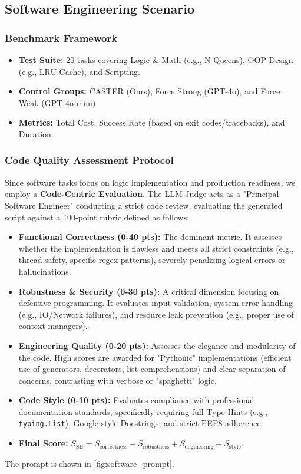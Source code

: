 \documentclass{article}
\theoremstyle{plain}
\theoremstyle{definition}
\theoremstyle{remark}
\begin{document}
\subsection{Software Engineering Scenario}

\subsubsection{Benchmark Framework}
\begin{itemize}
    \item \textbf{Test Suite:} 20 tasks covering Logic \& Math (e.g., N-Queens), OOP Design (e.g., LRU Cache), and Scripting.
    \item \textbf{Control Groups:} CASTER (Ours), Force Strong (GPT-4o), and Force Weak (GPT-4o-mini).
    \item \textbf{Metrics:} Total Cost, Success Rate (based on exit codes/tracebacks), and Duration.
\end{itemize}

\subsubsection{Code Quality Assessment Protocol}
Since software tasks focus on logic implementation and production readiness, we employ a \textbf{Code-Centric Evaluation}. The LLM Judge acts as a "Principal Software Engineer" conducting a strict code review, evaluating the generated script against a 100-point rubric defined as follows:
\begin{itemize}
    \item \textbf{Functional Correctness (0-40 pts):} The dominant metric. It assesses whether the implementation is flawless and meets all strict constraints (e.g., thread safety, specific regex patterns), severely penalizing logical errors or hallucinations.
    \item \textbf{Robustness \& Security (0-30 pts):} A critical dimension focusing on defensive programming. It evaluates input validation, system error handling (e.g., IO/Network failures), and resource leak prevention (e.g., proper use of context managers).
    \item \textbf{Engineering Quality (0-20 pts):} Assesses the elegance and modularity of the code. High scores are awarded for "Pythonic" implementations (efficient use of generators, decorators, list comprehensions) and clear separation of concerns, contrasting with verbose or "spaghetti" logic.
    \item \textbf{Code Style (0-10 pts):} Evaluates compliance with professional documentation standards, specifically requiring full Type Hints (e.g., \texttt{typing.List}), Google-style Docstrings, and strict PEP8 adherence.
    \item \textbf{Final Score:} $S_{\text{SE}} = S_{\text{correctness}} + S_{\text{robustness}} + S_{\text{engineering}} + S_{\text{style}}$.
\end{itemize}
The prompt is shown in \cref{fig:software_prompt}.
\end{document}
